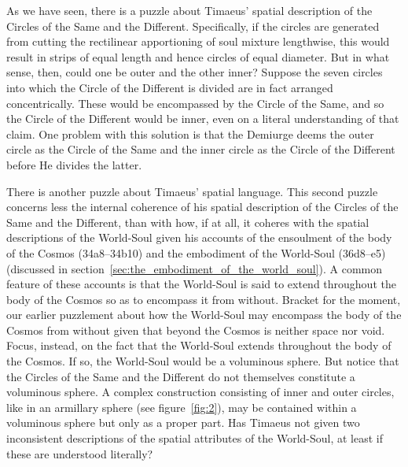 As we have seen, there is a puzzle about Timaeus' spatial description of the Circles of the Same and the Different. Specifically, if the circles are generated from cutting the rectilinear apportioning of soul mixture lengthwise, this would result in strips of equal length and hence circles of equal diameter. But in what sense, then, could one be outer and the other inner? Suppose the seven circles into which the Circle of the Different is divided are in fact arranged concentrically. These would be encompassed by the Circle of the Same, and so the Circle of the Different would be inner, even on a literal understanding of that claim. One problem with this solution is that the Demiurge deems the outer circle as the Circle of the Same and the inner circle as the Circle of the Different before He divides the latter.

There is another puzzle about Timaeus' spatial language. This second puzzle concerns less the internal coherence of his spatial description of the Circles of the Same and the Different, than with how, if at all, it coheres with the spatial descriptions of the World-Soul given his accounts of the ensoulment of the body of the Cosmos (34a8--34b10) and the embodiment of the World-Soul (36d8--e5) (discussed in section~\ref{sec:the_embodiment_of_the_world_soul}). A common feature of these accounts is that the World-Soul is said to extend throughout the body of the Cosmos so as to encompass it from without. Bracket for the moment, our earlier puzzlement about how the World-Soul may encompass the body of the Cosmos from without given that beyond the Cosmos is neither space nor void. Focus, instead, on the fact that the World-Soul extends throughout the body of the Cosmos. If so, the World-Soul would be a voluminous sphere. But notice that the Circles of the Same and the Different do not themselves constitute a voluminous sphere. A complex construction consisting of inner and outer circles, like in an armillary sphere (see figure~\ref{fig:2}), may be contained within a voluminous sphere but only as a proper part. Has Timaeus not given two inconsistent descriptions of the spatial attributes of the World-Soul, at least if these are understood literally?

